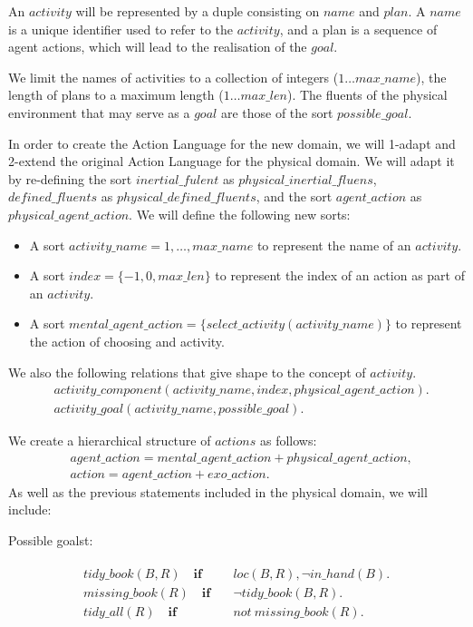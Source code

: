 \documentclass[11pt, oneside]{article}
\begin{document}
An $activity$ will be represented by a duple consisting on $name$ and $plan$. A $name$ is a unique identifier used to refer to the $activity$, and a plan is a sequence of agent actions, which will lead to the realisation of the $goal$. 
 
We limit the names of activities to a collection of integers ($1\dots max\_name$), the length of plans to a maximum length ($1\dots max\_len$). The fluents of the physical environment that may serve as a $goal$ are those of the sort $possible\_goal$. 

In order to create the Action Language for the new domain, we will 1-adapt and 2-extend the original Action Language for the physical domain.
We will adapt it by re-defining the sort $inertial\_fulent$ as $physical\_inertial\_fluens$, $defined\_fluents$ as $physical\_defined\_fluents$, and the sort $agent\_action$ as $physical\_agent\_action$. We will define the following new sorts: 
\begin{itemize}
	\item A sort $activity\_name = {1,\dots, max\_name}$ to represent the name of an $activity$.	
	\item A sort $index = \{-1,0,max\_len\}$ to represent the index of an action as part of an $activity$. 
	\item A sort $mental\_agent\_action = \{select\_activity(activity\_name)\}$ to represent the action of choosing and activity.
\end{itemize}

We also the following relations that give shape to the concept of $activity$. 	
	\begin{align*}
	&activity\_component(activity\_name, index, physical\_agent\_action).\\
	&activity\_goal(activity\_name, possible\_goal).
	\end{align*}
	
We create a hierarchical structure of $actions$ as follows: 
\begin{align*}
&agent\_action = mental\_agent\_action + physical\_agent\_action, \\
&action = agent\_action + exo\_action.
\end{align*}
As well as the previous statements included in the physical domain, we will include:
	
Possible goalst:

\begin{align}\begin{split}
tidy\_book(B,R) \quad \mathbf{if}\quad & loc(B,R), \neg in\_hand(B).\\
missing\_book(R) \quad \mathbf{if}\quad &\neg tidy\_book(B,R).\\
tidy\_all(R) \quad \mathbf{if}\quad & not\ missing\_book(R).
\end{split}\end{align}
\end{document}
